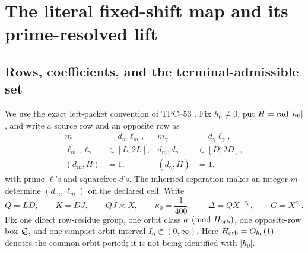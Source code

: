 \section{The literal fixed-shift map and its prime-resolved lift}
\label{sec:literal-map}

\subsection{Rows, coefficients, and the terminal-admissible set}

We use the exact left-packet convention of TPC--53
\citep{WangTPC53}.  Fix \(h_0\ne0\), put \(H=\operatorname{rad}|h_0|\), and write a
source row and an opposite row as
\begin{equation}
 \begin{aligned}
 m&=d_m\ell_m,&
 m_\gamma&=d_\gamma\ell_\gamma,\\
 \ell_m,\ell_\gamma&\in[L,2L],&
 d_m,d_\gamma&\in[D,2D],\\
 (d_m,H)&=1,&
 (d_\gamma,H)&=1.
 \end{aligned}
 \label{eq:tpc55-rows}
\end{equation}
with prime \(\ell\)'s and squarefree \(d\)'s.  The inherited separation
makes an integer \(m\) determine \((d_m,\ell_m)\) on the declared cell.
Write
\begin{equation}
 Q=LD,
 \qquad K=DJ,
 \qquad QJ\asymp X,
 \qquad \kappa_0=\frac1{400},
 \qquad \Delta=QX^{-\kappa_0},
 \qquad G=X^{\kappa_0}.
 \label{eq:tpc55-scales}
\end{equation}
Fix one direct row-residue group, one orbit class
\(a\pmod{H_{\rm orb}}\), one opposite-row box \(\mathcal Q\), and one compact
orbit interval \(I_0\Subset(0,\infty)\).  Here
\(H_{\rm orb}=O_{h_0}(1)\) denotes the common
orbit period; it is not being identified with \(|h_0|\).

